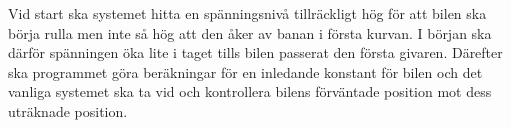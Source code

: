 Vid start ska systemet hitta en spänningsnivå tillräckligt hög för att bilen
ska börja rulla men inte så hög att den åker av banan i första kurvan. I början
ska därför spänningen öka lite i taget tills bilen passerat den första givaren.
Därefter ska programmet göra beräkningar för en inledande konstant för bilen
och det vanliga systemet ska ta vid och kontrollera bilens förväntade position
mot dess uträknade position.

